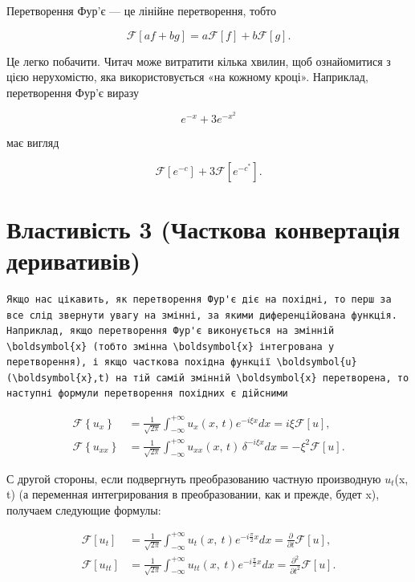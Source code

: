 \documentclass[
  ukrainian,
]{article}
\begin{document}
Перетворення Фур'є --- це лінійне перетворення, тобто

\[
\mathscr{F}[af+bg]=a\mathscr{F}[f]+b\mathscr{F}[g].
\]

Це легко побачити. Читач може витратити кілька хвилин, щоб ознайомитися
з цією нерухомістю, яка використовується «на кожному кроці». Наприклад,
перетворення Фур'є виразу

\[
e^{-x} + 3e^{-x^2}
\]

має вигляд

\[
\mathscr{F}[e^{-c}] + 3\mathscr{F}[e^{-c^*}].
\]

\section{Властивість 3 (Часткова конвертація
деривативів)}\label{ux432ux43bux430ux441ux442ux438ux432ux456ux441ux442ux44c-3-ux447ux430ux441ux442ux43aux43eux432ux430-ux43aux43eux43dux432ux435ux440ux442ux430ux446ux456ux44f-ux434ux435ux440ux438ux432ux430ux442ux438ux432ux456ux432}

\begin{verbatim}
Якщо нас цікавить, як перетворення Фур'є діє на похідні, то перш за все слід звернути увагу на змінні, за якими диференційована функція. Наприклад, якщо перетворення Фур'є виконується на змінній \boldsymbol{x} (тобто змінна \boldsymbol{x} інтегрована у перетворення), і якщо часткова похідна функції \boldsymbol{u}(\boldsymbol{x},t) на тій самій змінній \boldsymbol{x} перетворена, то наступні формули перетворення похідних є дійсними
\end{verbatim}

\[
\begin{split} \mathcal{F}\left\{u_{x}\right\} &= \frac{1}{\sqrt{2\pi}} \int_{-\infty}^{+\infty} u_{x}\left(x,\,t\right) e^{-i\xi x} dx = i\xi \mathcal{F}\left[u\right], \\ \mathcal{F}\left\{u_{xx}\right\} &= \frac{1}{\sqrt{2\pi}} \int_{-\infty}^{+\infty} u_{xx}\left(x,\,t\right) \, \delta^{-i\xi x} dx = -\xi^{2} \mathcal{F}\left[u\right]. \end{split}
\]

С другой стороны, если подвергнуть преобразованию частную производную
\(u_t\)(x, t) (а переменная интегрирования в преобразовании, как и
прежде, будет x), получаем следующие формулы:

\[
\begin{aligned} \mathcal{F}\left[u_{t}\right] &= \frac{1}{\sqrt{2\pi}} \int_{-\infty}^{+\infty} u_{t}\left(x, \ t\right) e^{-i\frac{\pi}{2}x} dx = \frac{\partial}{\partial t} \mathcal{F}\left[u\right], \\ \mathcal{F}\left[u_{tt}\right] &= \frac{1}{\sqrt{2\pi}} \int_{-\infty}^{+\infty} u_{tt}\left(x, \ t\right) e^{-i\frac{\pi}{2}x} dx = \frac{\partial^{2}}{\partial t^{2}} \mathcal{F}\left[u\right]. \end{aligned}
\]
\end{document}
